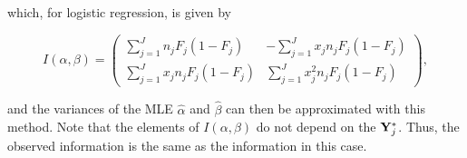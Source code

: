 \documentclass{homework}
\begin{document}
which, for logistic regression, is given by 

\begin{equation}
    I(\alpha, \beta) = \left(\begin{array}{cc}
       \sum_{j=1}^{J} n_j F_j (1-F_j) & - \sum_{j=1}^{J} x_j n_j F_j (1-F_j) \\
         \sum_{j=1}^{J} x_j n_j F_j (1-F_j) & \sum_{j=1}^{J} x_j^2 n_j F_j (1-F_j)
    \end{array}\right),
\end{equation}

and the variances of the MLE $\hat{\alpha}$ and $\hat{\beta}$ can then be approximated with this method. Note that the elements of $I(\alpha, \beta)$ do not depend on the ${\bf Y}_j^{*}$. Thus, the observed information is the same as the information in this case. \\








\end{document}
